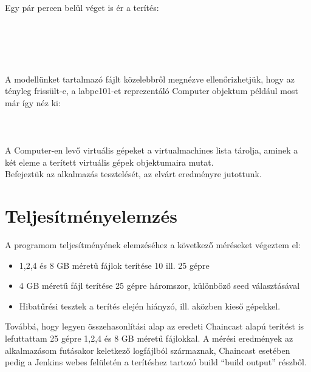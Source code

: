 Egy pár percen belül véget is ér a terítés:\\\\
\\
\\
\\\\

A modellünket tartalmazó fájlt közelebbről megnézve ellenőrizhetjük, hogy az tényleg frissült-e, a labpc101-et reprezentáló Computer objektum például most már így néz ki:\\\\
\\\\
A Computer-en levő virtuális gépeket a virtualmachines lista tárolja, aminek a két eleme a terített virtuális gépek objektumaira mutat.\\

Befejeztük az alkalmazás tesztelését, az elvárt eredményre jutottunk.

\section{Teljesítményelemzés}
A programom teljesítményének elemzéséhez a következő méréseket végeztem el:

\begin{itemize}
  \item 1,2,4 és 8 GB méretű fájlok terítése 10 ill. 25 gépre
  \item 4 GB méretű fájl terítése 25 gépre háromszor, különböző seed választásával
  \item Hibatűrési tesztek a terítés elején hiányzó, ill. aközben kieső gépekkel.
\end{itemize}

Továbbá, hogy legyen összehasonlítási alap  az eredeti Chaincast alapú terítést is lefuttattam 25 gépre 1,2,4 és 8 GB méretű fájlokkal.
A mérési eredmények az alkalmazásom futásakor keletkező logfájlból származnak, Chaincast esetében pedig a Jenkins webes felületén a terítéshez tartozó build ``build output'' részből.

